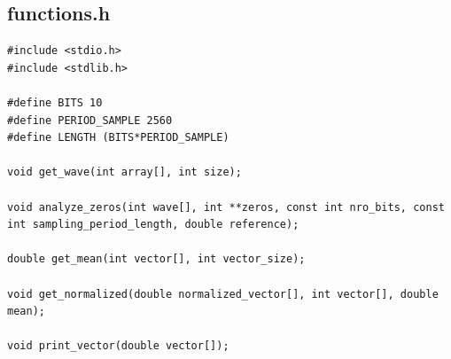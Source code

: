 \documentclass[11pt,a4paper]{report}
\begin{document}
	
	\subsection{functions.h}
		\begin{verbatim}
#include <stdio.h>
#include <stdlib.h>
		
#define BITS 10
#define PERIOD_SAMPLE 2560
#define LENGTH (BITS*PERIOD_SAMPLE)
		
void get_wave(int array[], int size);
		
void analyze_zeros(int wave[], int **zeros, const int nro_bits, const int sampling_period_length, double reference);
		
double get_mean(int vector[], int vector_size);
		
void get_normalized(double normalized_vector[], int vector[], double mean);
		
void print_vector(double vector[]);
		\end{verbatim}
		
	
\end{document}
